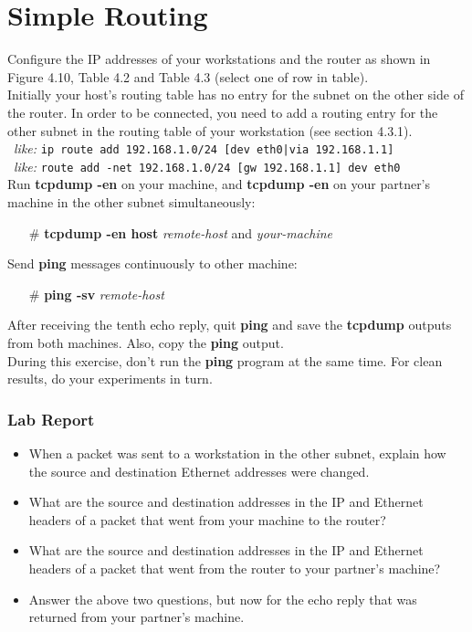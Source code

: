 \documentclass{../UTNetLab}
\begin{document}
\section{Simple Routing}
    Configure the IP addresses of your workstations and the router as shown in Figure 4.10, Table 4.2 and Table 4.3 (select one of row in table). \\
    Initially your host’s routing table has no entry for the subnet on the other side of the router.
    In order to be connected, you need to add a routing entry for the other subnet in the routing table of your workstation (see section 4.3.1). \\
    \, \textit{like: }\texttt{ip route add 192.168.1.0/24 [dev eth0|via 192.168.1.1]} \\
    \, \textit{like: }\texttt{route add -net 192.168.1.0/24 [gw 192.168.1.1] dev eth0}\\
    Run \textbf{tcpdump -en} on your machine, and \textbf{tcpdump -en} on your partner’s machine in the other subnet simultaneously:
    \begin{itemize}
        \item [\#] \textbf{tcpdump -en host} \textit{remote-host} and \textit{your-machine}
    \end{itemize}
    Send \textbf{ping} messages continuously to other machine:
    \begin{itemize}
        \item [\#] \textbf{ping -sv} \textit{remote-host}
    \end{itemize}
    After receiving the tenth echo reply, quit \textbf{ping} and save the \textbf{tcpdump} outputs from both machines.
    Also, copy the \textbf{ping} output. \\
    During this exercise, don’t run the \textbf{ping} program at the same time.
    For clean results, do your experiments in turn.
    \subsubsection*{Lab Report}
    \begin{itemize}
        \setlength{\itemindent}{0pt}
        \item When a packet was sent to a workstation in the other subnet, explain how the source and destination Ethernet addresses were changed.
        \item What are the source and destination addresses in the IP and Ethernet headers of a packet that went from your machine to the router?
        \item What are the source and destination addresses in the IP and Ethernet headers of a packet that went from the router to your partner’s machine?
        \item Answer the above two questions, but now for the echo reply that was returned from your partner’s machine.
    \end{itemize}
\end{document}
